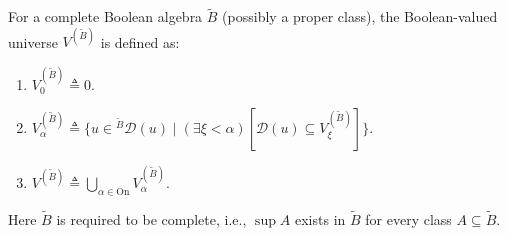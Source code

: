 For a complete Boolean algebra $\tilde{B}$ (possibly a proper class), the Boolean-valued universe $V^{(\tilde{B})}$ is defined as:

\begin{enumerate}
\item $V_{0}^{(\tilde{B})} \triangleq 0$.
\item $V_{\alpha}^{(\tilde{B})} \triangleq \{u \in {}^{\tilde{B}} \mathcal{D}(u) \mid (\exists \xi < \alpha)[\mathcal{D}(u) \subseteq V_{\xi}^{(\tilde{B})}]\}$.
\item $V^{(\tilde{B})} \triangleq \bigcup_{\alpha \in \mathrm{On}} V_{\alpha}^{(\tilde{B})}$.
\end{enumerate}

Here $\tilde{B}$ is required to be complete, i.e., $\sup A$ exists in $\tilde{B}$ for every class $A \subseteq \tilde{B}$.$$
